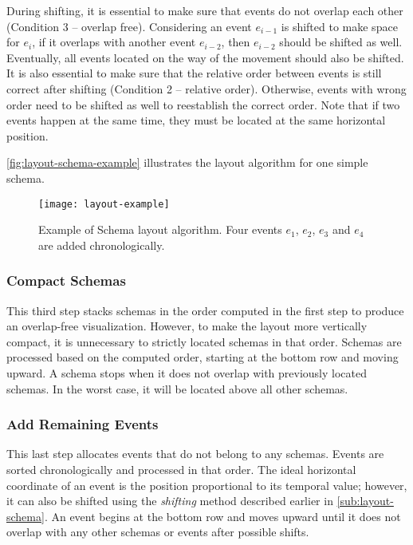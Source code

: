 During shifting, it is essential to make sure that events do not overlap each other (Condition 3 -- overlap free). Considering an event $e_{i-1}$ is shifted to make space for $e_i$, if it overlaps with another event $e_{i-2}$, then $e_{i-2}$ should be shifted as well. Eventually, all events located on the way of the movement should also be shifted. It is also essential to make sure that the relative order between events is still correct after shifting (Condition 2 -- relative order). Otherwise, events with wrong order need to be shifted as well to reestablish the correct order. Note that if two events happen at the same time, they must be located at the same horizontal position. 

\autoref{fig:layout-schema-example} illustrates the layout algorithm for one simple schema.

\begin{figure}[!htb]
	\centering
	\texttt{[image: layout-example]}
	\caption[Example of Schema layout algorithm]{Example of Schema layout algorithm. Four events $e_1$, $e_2$, $e_3$ and $e_4$ are added chronologically.}
	\label{fig:layout-schema-example}
\end{figure}

\subsubsection{Compact Schemas}
This third step stacks schemas in the order computed in the first step to produce an overlap-free visualization. However, to make the layout more vertically compact, it is unnecessary to strictly located schemas in that order. Schemas are processed based on the computed order, starting at the bottom row and moving upward. A schema stops when it does not overlap with previously located schemas. In the worst case, it will be located above all other schemas.

\subsubsection{Add Remaining Events}
This last step allocates events that do not belong to any schemas. Events are sorted chronologically and processed in that order. The ideal horizontal coordinate of an event is the position proportional to its temporal value; however, it can also be shifted using the \emph{shifting} method described earlier in \autoref{sub:layout-schema}. An event begins at the bottom row and moves upward until it does not overlap with any other schemas or events after possible shifts. 

